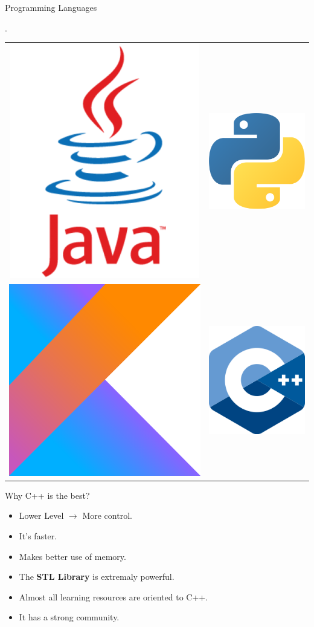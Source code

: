 \documentclass{beamer}
\begin{document}
\begin{frame}{Programming Languages}

   \vspace{2mm}
   \begin{centering}
   \bgroup
   \def\arraystretch{5}
   \setlength\tabcolsep{35pt}.
   \begin{tabular}{ c c }
   \includegraphics[width=0.23\linewidth]{../img/java} &
   \includegraphics[width=0.23\linewidth]{../img/python} \\
   \includegraphics[width=0.23\linewidth]{../img/kotlin} &
   \includegraphics[width=0.23\linewidth]{../img/cpp}
   \end{tabular}
   \egroup
   \end{centering}

\end{frame}

\begin{frame}{Why C++ is the best?}

  \begin{itemize}
    \item Lower Level $\rightarrow$ More control.
    \item It's faster.
    \item Makes better use of memory.
    \item The \textbf{STL Library} is extremaly powerful.
    \item Almost all learning resources are oriented to C++.
    \item It has a strong community.
  \end{itemize}
  
\end{frame}
\end{document}

